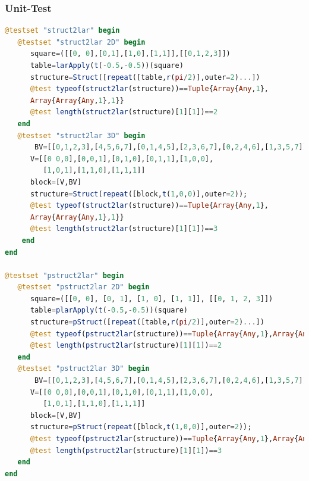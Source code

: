 \documentclass[a4paper,12pt]{article}
\begin{document}
\subsubsection{Unit-Test}
\begin{lstlisting}[language=Julia]
@testset "struct2lar" begin
   @testset "struct2lar 2D" begin
      square=([[0, 0],[0,1],[1,0],[1,1]],[[0,1,2,3]])
      table=larApply(t(-0.5,-0.5))(square)
      structure=Struct([repeat([table,r(pi/2)],outer=2)...])
      @test typeof(struct2lar(structure))==Tuple{Array{Any,1},
      Array{Array{Any,1},1}}
      @test length(struct2lar(structure)[1][1])==2
   end
   @testset "struct2lar 3D" begin
       BV=[[0,1,2,3],[4,5,6,7],[0,1,4,5],[2,3,6,7],[0,2,4,6],[1,3,5,7]]
      V=[[0 0,0],[0,0,1],[0,1,0],[0,1,1],[1,0,0],
         [1,0,1],[1,1,0],[1,1,1]]
      block=[V,BV]
      structure=Struct(repeat([block,t(1,0,0)],outer=2));
      @test typeof(struct2lar(structure))==Tuple{Array{Any,1},
      Array{Array{Any,1},1}}
      @test length(struct2lar(structure)[1][1])==3
    end
end

@testset "pstruct2lar" begin
   @testset "pstruct2lar 2D" begin
      square=([[0, 0], [0, 1], [1, 0], [1, 1]], [[0, 1, 2, 3]])
      table=plarApply(t(-0.5,-0.5))(square)
      structure=pStruct([repeat([table,r(pi/2)],outer=2)...])
      @test typeof(pstruct2lar(structure))==Tuple{Array{Any,1},Array{Any,1}}
      @test length(pstruct2lar(structure)[1][1])==2
   end
   @testset "pstruct2lar 3D" begin
       BV=[[0,1,2,3],[4,5,6,7],[0,1,4,5],[2,3,6,7],[0,2,4,6],[1,3,5,7]]
      V=[[0 0,0],[0,0,1],[0,1,0],[0,1,1],[1,0,0],
         [1,0,1],[1,1,0],[1,1,1]]
      block=[V,BV]
      structure=pStruct(repeat([block,t(1,0,0)],outer=2));
      @test typeof(pstruct2lar(structure))==Tuple{Array{Any,1},Array{Any,1}}
      @test length(pstruct2lar(structure)[1][1])==3
   end
end
\end{lstlisting}
\end{document}
